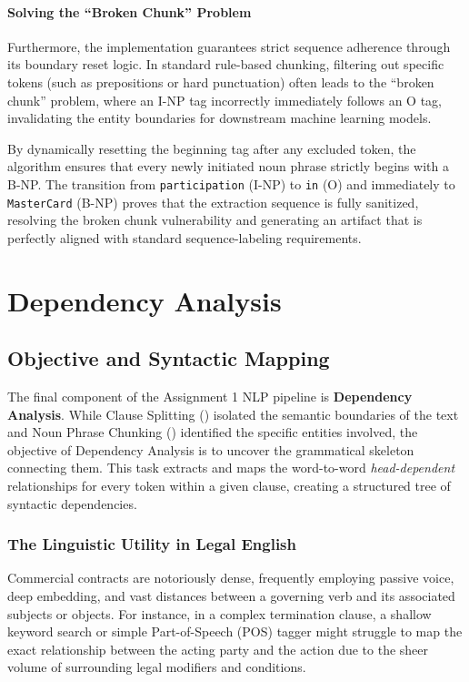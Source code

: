 \documentclass[twoside,final]{hcmut-report}
\newcommand{\result}[1]{\fcolorbox{red}{white}{#1}}
\begin{document}
\paragraph{Solving the ``Broken Chunk'' Problem}
Furthermore, the implementation guarantees strict sequence adherence through its boundary reset logic. In standard rule-based chunking, filtering out specific tokens (such as prepositions or hard punctuation) often leads to the ``broken chunk'' problem, where an I-NP tag incorrectly immediately follows an O tag, invalidating the entity boundaries for downstream machine learning models.

\medskip

By dynamically resetting the beginning tag after any excluded token, the algorithm ensures that every newly initiated noun phrase strictly begins with a B-NP. The transition from \texttt{participation} (I-NP) to \texttt{in} (O) and immediately to \texttt{MasterCard} (B-NP) proves that the extraction sequence is fully sanitized, resolving the broken chunk vulnerability and generating an artifact that is perfectly aligned with standard sequence-labeling requirements.

\section{Dependency Analysis}
\label{task_1.3}
\subsection{Objective and Syntactic Mapping}
The final component of the Assignment 1 NLP pipeline is \textbf{Dependency Analysis}. While Clause Splitting (\result{Section~\ref{task_1.1}}) isolated the semantic boundaries of the text and Noun Phrase Chunking (\result{Section~\ref{task_1.2}}) identified the specific entities involved, the objective of Dependency Analysis is to uncover the grammatical skeleton connecting them. This task extracts and maps the word-to-word \textit{head-dependent} relationships for every token within a given clause, creating a structured tree of syntactic dependencies.

\subsubsection*{The Linguistic Utility in Legal English}
Commercial contracts are notoriously dense, frequently employing passive voice, deep embedding, and vast distances between a governing verb and its associated subjects or objects. For instance, in a complex termination clause, a shallow keyword search or simple Part-of-Speech (POS) tagger might struggle to map the exact relationship between the acting party and the action due to the sheer volume of surrounding legal modifiers and conditions.
\end{document}

